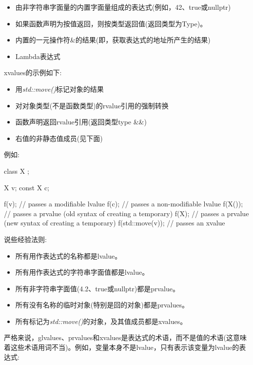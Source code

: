 \begin{itemize}
  \item 由非字符串字面量的内置字面量组成的表达式(例如，42、true或nullptr)
  \item 如果函数声明为按值返回，则按类型返回值(返回类型为Type)。
  \item 内置的一元操作符\&的结果(即，获取表达式的地址所产生的结果)
  \item Lambda表达式
\end{itemize}

xvalues的示例如下:\par

\begin{itemize}
  \item 用\textit{std::move()}标记对象的结果
  \item 对对象类型(不是函数类型)的rvalue引用的强制转换
  \item 函数声明返回rvalue引用(返回类型type \&\&)
  \item 右值的非静态值成员(见下面)
\end{itemize}

例如:\par

\begin{codebox}[cpp]
class X {
};

X v;
const X c;

f(v); // passes a modifiable lvalue
f(c); // passes a non-modifiable lvalue
f(X()); // passes a prvalue (old syntax of creating a temporary)
f(X{}); // passes a prvalue (new syntax of creating a temporary)
f(std::move(v)); // passes an xvalue
\end{codebox}

说些经验法则:\par

\begin{itemize}
  \item 所有用作表达式的名称都是lvalue。
  \item 所有用作表达式的字符串字面值都是lvalue。
  \item 所有非字符串字面值(4.2、true或nullptr)都是prvalue。
  \item 所有没有名称的临时对象(特别是回的对象)都是prvalues。
  \item 所有标记为\textit{std::move()}的对象，及其值成员都是xvalues。
\end{itemize}

严格来说，glvalues、prvalues和xvalues是表达式的术语，而不是值的术语(这意味着这些术语用词不当)。例如，变量本身不是lvalue，只有表示该变量为lvalue的表达式:\par

